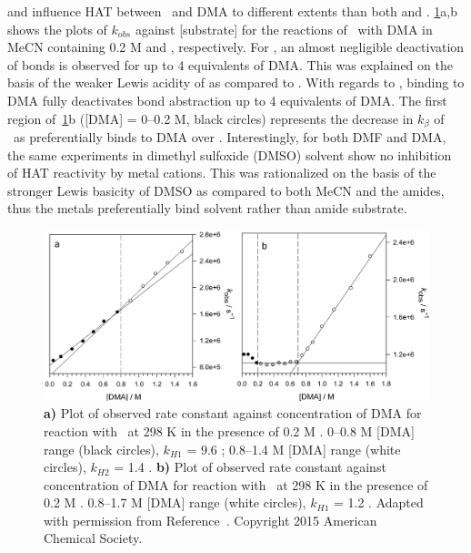  and  influence HAT between \cumo\ and DMA to
different extents than both  and .
\ref{fig:k-metals-naca}a,b shows the plots of $k_{obs}$ against [substrate] for
the reactions of \cumo\ with DMA in MeCN containing 0.2 M  and
, respectively. For , an almost negligible
deactivation of  bonds is observed for up to 4 equivalents of DMA. This
was explained on the basis of the weaker Lewis acidity of  as compared
to . With regards to , binding to DMA fully deactivates
 bond abstraction up to 4 equivalents of DMA. The first region
of~\ref{fig:k-metals-naca}b ([DMA] = 0--0.2 M, black circles) represents the
decrease in $k_\beta$ of \cumo\ as  preferentially binds to DMA
over \cumo. Interestingly, for both DMF and DMA, the same experiments in
dimethyl sulfoxide (DMSO) solvent show no inhibition of HAT reactivity by metal
cations. This was rationalized on the basis of the stronger Lewis basicity of
DMSO as compared to both MeCN and the amides, thus the metals preferentially
bind solvent rather than amide substrate.

\begin{figure}[!htbp]
  \includegraphics[width=\textwidth]{figures/exptdma-na-ca.png}
  \caption[Plot of observed rate constant against concentration of DMA for
  reaction with \cumo\ at 298 K in the presence of 0.2 M  and
  .] {\textbf{a)} Plot of observed rate constant against
	  concentration of DMA for reaction with \cumo\ at 298 K in the
	  presence of 0.2 M . 0--0.8 M [DMA] range (black circles),
	  $k_{H1}$ = 9.6 \Ms; 0.8--1.4 M [DMA] range (white circles),
	  $k_{H2}$ = 1.4 \Ms.  \textbf{b)} Plot of observed rate constant
  against concentration of DMA for reaction with \cumo\ at 298 K in the
  presence of 0.2 M . 0.8--1.7 M [DMA] range (white circles),
  $k_{H1}$ = 1.2 \Ms. Adapted with permission from
  Reference~\protect{}. Copyright 2015 American
  Chemical Society.} \label{fig:k-metals-naca}
\end{figure}

